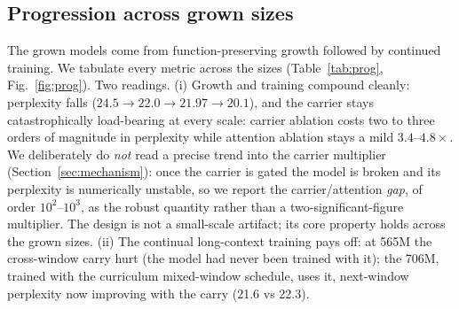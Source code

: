 \documentclass[journal]{IEEEtran}
\begin{document}
\subsection{Progression across grown sizes}
The grown models come from function-preserving growth followed by continued training. We tabulate every metric across the sizes (Table~\ref{tab:prog}, Fig.~\ref{fig:prog}). Two readings. (i) Growth and training compound cleanly: perplexity falls ($24.5 \to 22.0 \to 21.97 \to 20.1$), and the carrier stays catastrophically load-bearing at every scale: carrier ablation costs two to three orders of magnitude in perplexity while attention ablation stays a mild $3.4$--$4.8\times$. We deliberately do \emph{not} read a precise trend into the carrier multiplier (Section~\ref{sec:mechanism}): once the carrier is gated the model is broken and its perplexity is numerically unstable, so we report the carrier/attention \emph{gap}, of order $10^2$--$10^3$, as the robust quantity rather than a two-significant-figure multiplier. The design is not a small-scale artifact; its core property holds across the grown sizes. (ii) The continual long-context training pays off: at 565M the cross-window carry hurt (the model had never been trained with it); the 706M, trained with the curriculum mixed-window schedule, uses it, next-window perplexity now improving with the carry (21.6 vs 22.3).
\end{document}
